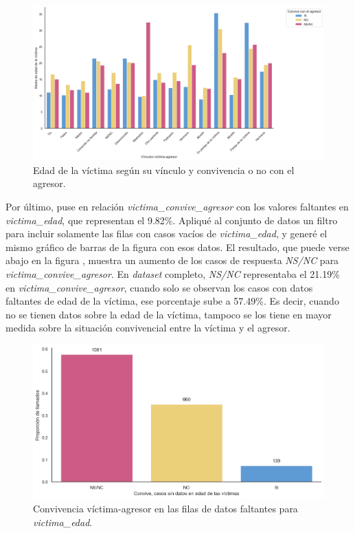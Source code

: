 \documentclass[10 pt]{article}
\begin{document}
\begin{figure}[H]
    \begin{center}
    \includegraphics[scale=.4]{images/convive_edad_agresor.png}
    \caption{Edad de la víctima según su vínculo y convivencia o no con el agresor.}
    \label{edadconvagr}
    \end{center}
    \end{figure}


Por último, puse en relación \textit{victima\_convive\_agresor} con los valores faltantes en \textit{victima\_edad}, que representan el 9.82\%. Apliqué al conjunto de datos un filtro para incluir solamente las filas con casos vacíos de \textit{victima\_edad}, y generé el mismo gráfico de barras de la figura  con esos datos. El resultado, que puede verse abajo en la figura , muestra un aumento de los casos de respuesta \textit{NS/NC} para \textit{victima\_convive\_agresor}. En \textit{dataset} completo, \textit{NS/NC} representaba el 21.19\% en \textit{victima\_convive\_agresor}, cuando solo se observan los casos con datos faltantes de edad de la víctima, ese porcentaje sube a 57.49\%. Es decir, cuando no se tienen datos sobre la edad de la víctima, tampoco se los tiene en mayor medida sobre la situación convivencial entre la víctima y el agresor.

\begin{figure}[H]
    \begin{center}
    \includegraphics[scale=.5]{images/latex_convive_sd_edad_vic.png}
    \caption{Convivencia víctima-agresor en las filas de datos faltantes para \textit{victima\_edad}.}
    \label{conviveedadfaltantevic}
    \end{center}
    \end{figure}
\end{document}
